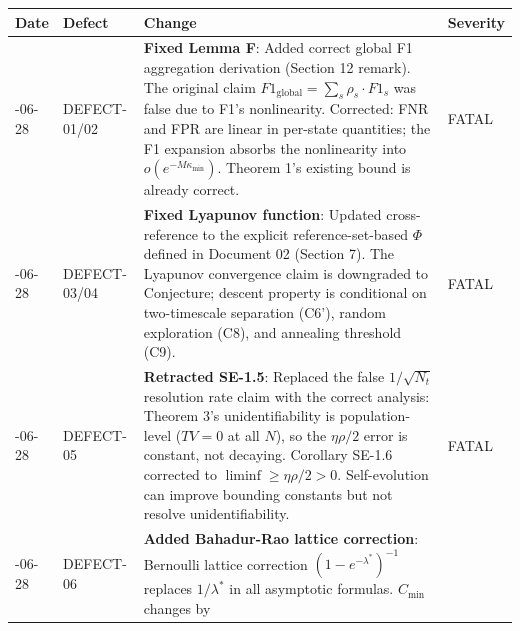 \documentclass[
  12pt,
]{article}
\begin{document}
\begin{longtable}[]{@{}
  >{\raggedright\arraybackslash}p{}
  >{\raggedright\arraybackslash}p{}
  >{\raggedright\arraybackslash}p{}
  >{\raggedright\arraybackslash}p{}@{}}
\toprule\noalign{}
\begin{minipage}[b]{\linewidth}\raggedright
Date
\end{minipage} & \begin{minipage}[b]{\linewidth}\raggedright
Defect
\end{minipage} & \begin{minipage}[b]{\linewidth}\raggedright
Change
\end{minipage} & \begin{minipage}[b]{\linewidth}\raggedright
Severity
\end{minipage} \\
\midrule\noalign{}
\endhead
\bottomrule\noalign{}
\endlastfoot
2026-06-28 & DEFECT-01/02 & \textbf{Fixed Lemma F}: Added correct global
F1 aggregation derivation (Section 12 remark). The original claim
\(F1_{\text{global}} = \sum_s \rho_s \cdot F1_s\) was false due to F1's
nonlinearity. Corrected: FNR and FPR are linear in per-state quantities;
the F1 expansion absorbs the nonlinearity into
\(o(e^{-M\kappa_{\min}})\). Theorem 1's existing bound is already
correct. & FATAL \\
2026-06-28 & DEFECT-03/04 & \textbf{Fixed Lyapunov function}: Updated
cross-reference to the explicit reference-set-based \(\Phi\) defined in
Document 02 (Section 7). The Lyapunov convergence claim is downgraded to
Conjecture; descent property is conditional on two-timescale separation
(C6'), random exploration (C8), and annealing threshold (C9). & FATAL \\
2026-06-28 & DEFECT-05 & \textbf{Retracted SE-1.5}: Replaced the false
\(1/\sqrt{N_t}\) resolution rate claim with the correct analysis:
Theorem 3's unidentifiability is population-level (\(TV=0\) at all
\(N\)), so the \(\eta\rho/2\) error is constant, not decaying. Corollary
SE-1.6 corrected to \(\liminf \geq \eta\rho/2 > 0\). Self-evolution can
improve bounding constants but not resolve unidentifiability. & FATAL \\
2026-06-28 & DEFECT-06 & \textbf{Added Bahadur-Rao lattice correction}:
Bernoulli lattice correction \((1-e^{-\lambda^*})^{-1}\) replaces
\(1/\lambda^*\) in all asymptotic formulas. \(C_{\min}\) changes by

\end{longtable}
\end{document}
